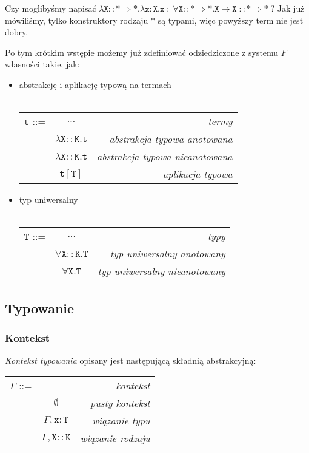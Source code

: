 \documentclass[11pt,leqno]{article}
\begin{document}
Czy moglibyśmy napisać $\mathtt{\lambda X::\ast \Rightarrow \ast. \lambda x:X.x \; : \; \forall X::\ast \Rightarrow \ast.X \rightarrow X \; ::\ast \Rightarrow \ast}\;$? Jak już mówiliśmy, tylko konstruktory rodzaju $\mathtt{\ast}$ są typami, więc powyższy term nie jest dobry.

Po tym krótkim wstępie możemy już zdefiniować odziedziczone z systemu $F$ własności takie, jak:  
\begin{itemize}
    \item abstrakcję i aplikację typową na termach \\ \\
\begin{tabular}{| l c r |}
  \hline
  $\mathtt{t}$ ::= & $\dots$ & \textit{termy} \\
   & $\mathtt{\lambda X::K.t}$ & \textit{abstrakcja typowa anotowana} \\
   & $\mathtt{\lambda X::K.t}$ & \textit{abstrakcja typowa nieanotowana}  \\
   & $\mathtt{t[T]}$ & \textit{aplikacja typowa} \\
  \hline
\end{tabular}

    \item typ uniwersalny \\ \\
\begin{tabular}{| l c r |}
  \hline
  $\mathtt{T}$ ::= & $\dots$ & \textit{typy}  \\
   & $\mathtt{\forall X::K.T}$ & \textit{typ uniwersalny anotowany} \\
   & $\mathtt{\forall X.T}$ & \textit{typ uniwersalny nieanotowany} \\
  \hline
\end{tabular}

\end{itemize}


\subsection{Typowanie}

\subsubsection{Kontekst}

\emph{Kontekst typowania} opisany jest następującą składnią abstrakcyjną: \\

\begin{tabular}{ | l c r | }
	\hline
	$\mathtt{\Gamma}$ ::= & & \textit{kontekst}\\
	& $\mathtt{\emptyset}$ & \textit{pusty kontekst} \\
	& $\mathtt{\Gamma,x:T}$& \textit{wiązanie typu} \\ 
	& $\mathtt{\Gamma,X::K}$& \textit{wiązanie rodzaju} \\ 
	\hline
\end{tabular} \\
	
\end{document}
